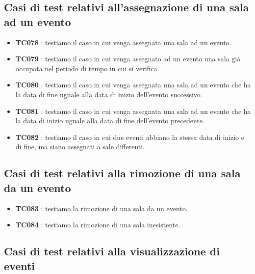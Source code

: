 \documentclass[11pt]{scrartcl} %
\begin{document}
\subsection{Casi di test relativi all'assegnazione di una sala ad un evento}

\begin{itemize}


	\item \textbf{TC078} : testiamo il caso in cui venga assegnata una sala ad un evento.

	\item \textbf{TC079} : testiamo il caso in cui venga assegnato ad un evento una sala già occupata nel periodo di tempo in cui si verifica.

	\item \textbf{TC080} : testiamo il caso in cui venga assegnata una sala ad un evento che ha la data di fine uguale alla data di inizio dell'evento successivo.

	\item \textbf{TC081} : testiamo il caso in cui venga assegnata una sala ad un evento che ha la data di inizio uguale alla data di fine dell'evento precedente.

	\item \textbf{TC082} : testiamo il caso in cui due eventi abbiano la stessa data di inizio e di fine, ma siano assegnati a sale differenti.


\end{itemize}

\subsection{Casi di test relativi alla rimozione di una sala da un evento}

\begin{itemize}

	\item \textbf{TC083} : testiamo la rimozione di una sala da un evento.

	\item \textbf{TC084} : testiamo la rimozione di una sala inesistente.

\end{itemize}


\subsection{Casi di test relativi alla visualizzazione di eventi}
\end{document}
